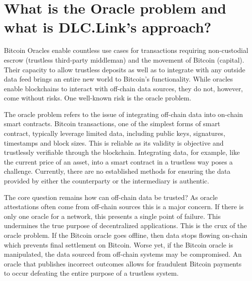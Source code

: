 \documentclass[twoside, a4paper, 11pt]{article}
\begin{document}
  \section{What is the Oracle problem and what is DLC.Link’s approach?}

  Bitcoin Oracles enable countless use cases for transactions requiring non-custodial escrow (trustless third-party middleman) and the movement of Bitcoin (capital). Their capacity to allow trustless deposits as well as to integrate with any outside data feed brings an entire new world to Bitcoin’s functionality. While oracles enable blockchains to interact with off-chain data sources, they do not, however, come without risks. One well-known risk is the oracle problem.

  The oracle problem refers to the issue of integrating off-chain data into on-chain smart contracts. Bitcoin transactions, one of the simplest forms of smart contract, typically leverage limited data, including public keys, signatures, timestamps and block sizes. This is reliable as its validity is objective and trustlessly verifiable through the blockchain. Integrating data, for example, like the current price of an asset, into a smart contract in a trustless way poses a challenge. Currently, there are no established methods for ensuring the data provided by either the counterparty or the intermediary is authentic.

  The core question remains how can off-chain data be trusted? As oracle attestations often come from off-chain sources this is a major concern. If there is only one oracle for a network, this presents a single point of failure. This undermines the true purpose of decentralized applications. This is the crux of the oracle problem. If the Bitcoin oracle goes offline, then data stops flowing on-chain which prevents final settlement on Bitcoin. Worse yet, if the Bitcoin oracle is manipulated, the data sourced from off-chain systems may be compromised. An oracle that publishes incorrect outcomes allows for fraudulent Bitcoin payments to occur defeating the entire purpose of a trustless system.
\end{document}
